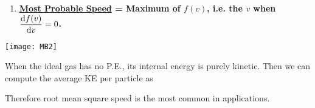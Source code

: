 \documentclass[class=article, crop=false, 12pt]{standalone}
\begin{document}
\begin{enumerate}
    \item \bf{\ul{Most Probable Speed}} = Maximum of $f(v)$, i.e. the $v$ when $\dvv{f(v)}{v} = 0$.
    
\end{enumerate}

\begin{center}
    \begin{minipage}{0.8\linewidth}
        \centering
        \texttt{[image: MB2]}
    \end{minipage}
\end{center}

\newpage
When the ideal gas has no P.E.,
its internal energy is purely kinetic.
Then we can compute the average KE per particle as 

Therefore root mean square speed is the most common in applications.

\theend
\end{document}
